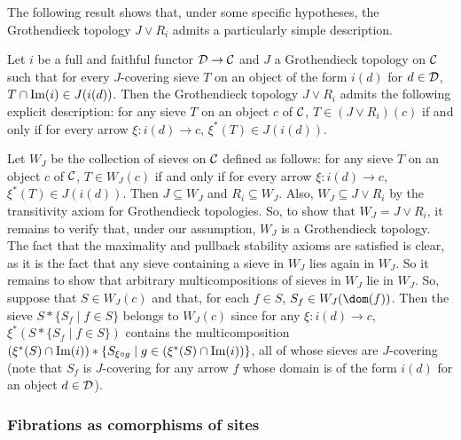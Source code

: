 \documentclass[a4paper,12pt]{article}
\begin{document}
The following result shows that, under some specific hypotheses, the Grothendieck topology $J\vee R_{i}$ admits a particularly simple description.

\begin{proposition}
	Let $i$ be a full and faithful functor ${\cal D}\to {\cal C}$ and $J$ a Grothendieck topology on $\cal C$ such that for every $J$-covering sieve $T$ on an object of the form $i(d)$ for $d\in {\cal D}$, $T\cap \textup{Im}(i)\in J(i(d))$. Then the Grothendieck topology $J\vee R_{i}$ admits the following explicit description: for any sieve $T$ on an object $c$ of $\cal C$, $T\in (J\vee R_{i})(c)$ if and only if for every arrow $\xi:i(d)\to c$, $\xi^{\ast}(T)\in J(i(d))$.  
\end{proposition}

\begin{proofs}
	Let $W_{J}$ be the collection of sieves on $\cal C$ defined as follows: for any sieve $T$ on an object $c$ of $\cal C$, $T\in W_{J}(c)$ if and only if for every arrow $\xi:i(d)\to c$, $\xi^{\ast}(T)\in J(i(d))$. Then $J\subseteq W_{J}$ and $R_{i}\subseteq W_{J}$. Also, $W_{J}\subseteq J\vee R_{i}$ by the transitivity axiom for Grothendieck topologies. So, to show that $W_{J}=J\vee R_{i}$, it remains to verify that, under our assumption, $W_{J}$ is a Grothendieck topology. The fact that the maximality and pullback stability axioms are satisfied is clear, as it is the fact that any sieve containing a sieve in $W_{J}$ lies again in $W_{J}$. So it remains to show that arbitrary multicompositions of sieves in $W_{J}$ lie in $W_{J}$. So, suppose that $S\in W_{J}(c)$ and that, for each $f\in S$, $S_{f}\in W_{J}(\dom(f))$. Then the sieve $S\ast \{S_{f} \mid f\in S\}$ belongs to $W_{J}(c)$ since for any  $\xi:i(d)\to c$, $\xi^{\ast}(S\ast \{S_{f} \mid f\in S\})$ contains the multicomposition $(\xi^{\ast}(S)\cap \textup{Im}(i)) \ast \{S_{\xi\circ g} \mid g\in  (\xi^{\ast}(S)\cap \textup{Im}(i))\}$, all of whose sieves are $J$-covering (note that $S_{f}$ is $J$-covering for any arrow $f$ whose domain is of the form $i(d)$ for an object $d\in {\cal D}$). 
\end{proofs}





\subsubsection{Fibrations as comorphisms of sites}\label{subsubsecfibrationscomorphisms}
\end{document}
